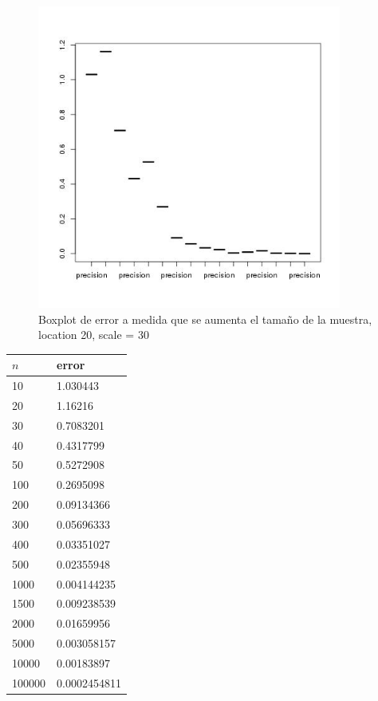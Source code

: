 \documentclass[letter,10pt]{article}
\begin{document}
\begin{itemize}
       \begin{figure}[H]
        \centering
              \includegraphics[width=100mm, scale=0.3]{p5b_boxplot_conv.jpg}
              \caption{Boxplot de error a medida que se aumenta el tamaño de la muestra, location 20, scale = 30}
          \end{figure}


\begin{table}[H]
    \centering
    \begin{tabular}{|l|l|}
    \hline
    $n$ & error \\ \hline
    10      &    1.030443  \\
    20      &    1.16216   \\
    30      &     0.7083201   \\
    40      &    0.4317799   \\
    50      &    0.5272908    \\
    100     &    0.2695098     \\
    200     &    0.09134366    \\
    300     &    0.05696333    \\
    400     &    0.03351027     \\
    500     &    0.02355948     \\
    1000     &   0.004144235     \\
    1500    &    0.009238539   \\
    2000    &    0.01659956    \\
    5000    &    0.003058157     \\
    10000    &    0.00183897   \\
    100000   &   0.0002454811   \\ \hline
    \end{tabular}
\end{table}



\end{itemize}
\end{document}
